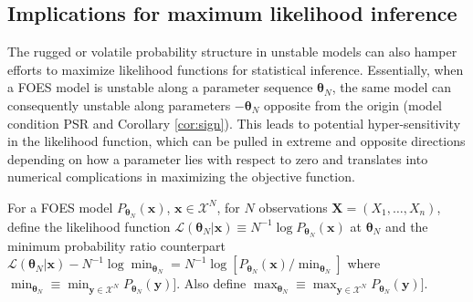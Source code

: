 \documentclass[]{article}
\theoremstyle{definition}
\begin{document}
\subsection{Implications for maximum likelihood
inference}\label{implications-for-maximum-likelihood-inference}

The rugged or volatile probability structure in unstable models can also
hamper efforts to maximize likelihood functions for statistical
inference. Essentially, when a FOES model is unstable along a parameter
sequence \(\boldsymbol \theta_N\), the same model can consequently
unstable along parameters \(-\boldsymbol \theta_N\) opposite from the
origin (model condition PSR and Corollary \ref{cor:sign}). This leads to
potential hyper-sensitivity in the likelihood function, which can be
pulled in extreme and opposite directions depending on how a parameter
lies with respect to zero and translates into numerical complications in
maximizing the objective function.

For a FOES model \(P_{\boldsymbol \theta_N}(\boldsymbol x)\),
\(\boldsymbol x\in\mathcal{X}^N\), for \(N\) observations
\(\boldsymbol X =(X_1,\ldots,X_n)\), define the likelihood function
\(\mathcal{L}(\boldsymbol \theta_N | \boldsymbol x) \equiv N^{-1}\log P_{\boldsymbol \theta_N }(\boldsymbol x)\)
at \(\boldsymbol \theta_N\) and the minimum probability ratio
counterpart
\(\mathcal{L}(\boldsymbol \theta_N | \boldsymbol x) - N^{-1} \log \min_{\boldsymbol \theta_N}= N^{-1}\log[P_{\boldsymbol \theta_N }(\boldsymbol x) /\min_{\boldsymbol \theta_N}]\)
where
\(\min_{\boldsymbol \theta_N} \equiv \min_{\boldsymbol y\in\mathcal{X}^N} P_{\boldsymbol \theta_N }(\boldsymbol y)]\).
Also define
\(\max_{\boldsymbol \theta_N} \equiv \max_{\boldsymbol y\in\mathcal{X}^N} P_{\boldsymbol \theta_N }(\boldsymbol y)]\).
\end{document}
